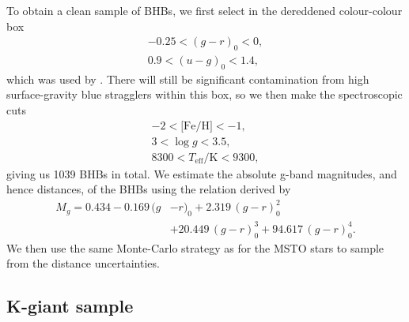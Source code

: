 \documentclass[useAMS,twocolumn,usenatbib]{mn2e}
\begin{document}
To obtain a clean sample of BHBs, we first select in the dereddened colour-colour 
box
%
\begin{gather}
-0.25 < (g-r)_0 < 0, \nonumber \\
0.9 < (u-g)_0 < 1.4,
\end{gather}
%
which was used by \cite{De11}. There will still be significant contamination 
from high surface-gravity blue stragglers within this box, so we then make 
the spectroscopic cuts
%
\begin{gather}
-2 < \lbrack \mathrm{Fe/H} \rbrack < -1, \nonumber \\
3 < \log g < 3.5, \\
8300 < T_\mathrm{eff}/\mathrm{K} < 9300, \nonumber
\end{gather}
%
giving us 1039 BHBs in total. We estimate the absolute g-band magnitudes, and hence distances, of the 
BHBs using the relation derived by \cite{De11}
%
\begin{equation}
\begin{split}
M_g = 0.434 - 0.169\,(g{}&-r)_0+2.319\,(g-r)_0^2  \\
         {}&+20.449\,(g-r)_0^3+94.617\,(g-r)_0^4.
\end{split}
\end{equation}
%
We then use the same Monte-Carlo strategy as for the MSTO stars to sample 
from the distance uncertainties.

\subsection{K-giant sample}
\end{document}
